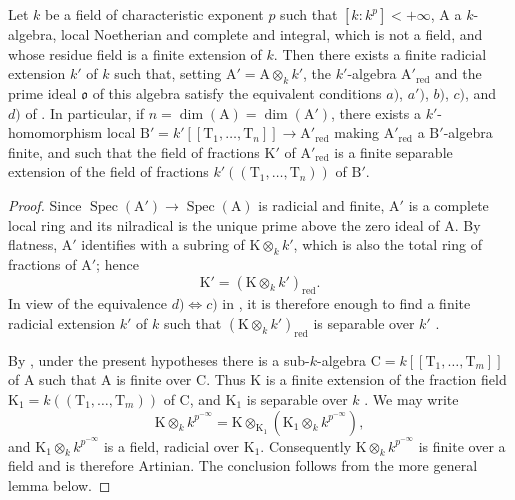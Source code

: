 \begin{corollary}[18.11.12]
\label{IV.18.11.12}
Let $k$ be a field of characteristic exponent $p$ such that $[k:k^p]<+\infty$, $\mathrm{A}$ a $k$-algebra, local Noetherian and complete and integral, which is not a field, and whose residue field is a finite extension of $k$.
Then there exists a finite radicial extension $k'$ of $k$ such that, setting $\mathrm{A}'=\mathrm{A}\otimes_kk'$, the $k'$-algebra $\mathrm{A}'_{\mathrm{red}}$ and the prime ideal $\mathfrak{o}$ of this algebra satisfy the equivalent conditions $a)$, $a')$, $b)$, $c)$, and $d)$ of .
In particular, if $n=\dim(\mathrm{A})=\dim(\mathrm{A}')$,
there exists a $k'$-homomorphism local $\mathrm{B}'=k'[[\mathrm{T}_1,\ldots,\mathrm{T}_n]]\to\mathrm{A}'_\mathrm{red}$ making $\mathrm{A}'_\mathrm{red}$ a $\mathrm{B}'$-algebra finite, and such that the field of fractions $\mathrm{K}'$ of $\mathrm{A}'_\mathrm{red}$ is a finite separable extension of the field of fractions $k'((\mathrm{T}_1,\ldots,\mathrm{T}_n))$ of $\mathrm{B}'$.
\end{corollary}

\begin{proof}
Since $\operatorname{Spec}(\mathrm{A}')\to\operatorname{Spec}(\mathrm{A})$ is radicial and finite, $\mathrm{A}'$ is a complete local ring and its nilradical is the unique prime above the zero ideal of $\mathrm{A}$. By flatness, $\mathrm{A}'$ identifies with a subring of $\mathrm{K}\otimes_kk'$, which is also the total ring of fractions of $\mathrm{A}'$; hence
\[
  \mathrm{K}'=(\mathrm{K}\otimes_kk')_{\mathrm{red}}.
\]
In view of the equivalence $d)\Leftrightarrow c)$ in , it is therefore enough to find a finite radicial extension $k'$ of $k$ such that $(\mathrm{K}\otimes_kk')_{\mathrm{red}}$ is separable over $k'$ .

By , under the present hypotheses there is a sub-$k$-algebra $\mathrm{C}=k[[\mathrm{T}_1,\ldots,\mathrm{T}_m]]$ of $\mathrm{A}$ such that $\mathrm{A}$ is finite over $\mathrm{C}$. Thus $\mathrm{K}$ is a finite extension of the fraction field $\mathrm{K}_1=k((\mathrm{T}_1,\ldots,\mathrm{T}_m))$ of $\mathrm{C}$, and $\mathrm{K}_1$ is separable over $k$ . We may write
\[
  \mathrm{K}\otimes_kk^{p^{-\infty}}
  =\mathrm{K}\otimes_{\mathrm{K}_1}(\mathrm{K}_1\otimes_kk^{p^{-\infty}}),
\]
and $\mathrm{K}_1\otimes_kk^{p^{-\infty}}$ is a field, radicial over $\mathrm{K}_1$. Consequently $\mathrm{K}\otimes_kk^{p^{-\infty}}$ is finite over a field and is therefore Artinian. The conclusion follows from the more general lemma below.
\end{proof}

